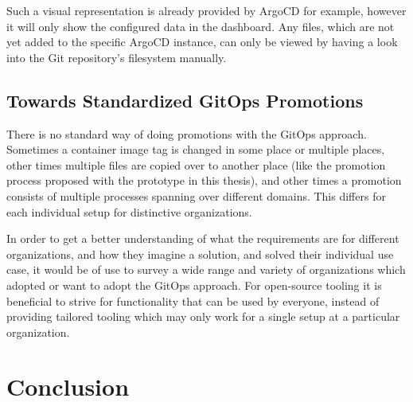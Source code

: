 Such a visual representation is already provided by ArgoCD for example,
however it will only show the configured data in the dashboard.
Any files, which are not yet added to the specific ArgoCD instance,
can only be viewed by having a look into the Git repository's filesystem manually.




\section*{Towards Standardized GitOps Promotions}

There is no standard way of doing promotions with the GitOps approach.
Sometimes a container image tag is changed in some place or multiple places,
other times multiple files are copied over to another place (like the promotion process proposed with the prototype in this thesis),
and other times a promotion consists of multiple processes spanning over different domains.
This differs for each individual setup for distinctive organizations.

In order to get a better understanding of what the requirements are for different organizations,
and how they imagine a solution, and solved their individual use case,
it would be of use to survey a wide range and variety of organizations which adopted or want to adopt the GitOps approach.
For open-source tooling it is beneficial to strive for functionality that can be used by everyone,
instead of providing tailored tooling which may only work for a single setup at a particular organization.

















\chapter{Conclusion}
\label{conclusion}

%
%
%
%


